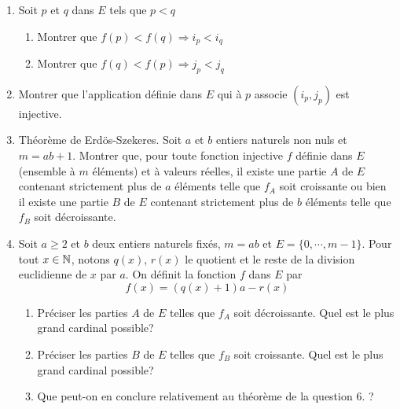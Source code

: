 \begin{enumerate}
\begin{enumerate}
\begin{itemize}
  \item $p\in A$
  \item $f_A$ d{\'e}croissante
\end{itemize}
On d{\'e}signe par $j_p$ le plus grand {\'e}l{\'e}ment de l'ensemble des cardinaux des parties v{\'e}rifiant ces conditions.
        \item Calculer les $j_p$ pour l'exemple de la question 1.
        \item Pr{\'e}senter les r{\'e}sultats des questions 2.b et 3.b. sous la forme d'un tableau dont la derni{\`e}re ligne est form{\'e}e par les couples $(i_p,j_p)$
      \end{enumerate}
\item Soit $p$ et $q$ dans $E$ tels que $p<q$
\begin{enumerate}
        \item Montrer que $f(p)<f(q)\Rightarrow i_p<i_q$
        \item Montrer que $f(q)<f(p)\Rightarrow j_p<j_q$
      \end{enumerate}
\item Montrer que l'application d{\'e}finie dans $E$ qui {\`a} $p$ associe $(i_p,j_p)$ est injective.
\item Th{\'e}or{\`e}me de Erd{\"o}s-Szekeres. \newline
Soit $a$ et $b$ entiers naturels non nuls et $m=ab+1$. Montrer que, pour toute fonction injective $f$ d{\'e}finie dans $E$ (ensemble à $m$ éléments) et {\`a} valeurs r{\'e}elles, il existe une partie $A$ de $E$ contenant strictement plus de $a$ {\'e}l{\'e}ments telle que $f_A$ soit croissante ou bien il existe une partie $B$ de $E$ contenant strictement plus de $b$ {\'e}l{\'e}ments telle que $f_B$ soit d{\'e}croissante.

\item Soit $a\geq 2$ et $b$ deux entiers naturels fix{\'e}s, $m=ab$ et $E=\{0,\cdots,m-1\}$. Pour tout $x\in\mathbb{N}$, notons $q(x)$, $r(x)$ le quotient et le reste de la division euclidienne de $x$ par $a$. On d{\'e}finit la fonction $f$ dans $E$ par
\[f(x)=(q(x)+1)a-r(x)\]
    \begin{enumerate}
        \item Pr{\'e}ciser les parties $A$ de $E$ telles que $f_A$ soit d{\'e}croissante. Quel est le plus grand cardinal possible?
        \item Pr{\'e}ciser les parties $B$ de $E$ telles que $f_B$ soit croissante. Quel est le plus grand cardinal
        possible?
        \item Que peut-on en conclure relativement au th{\'e}or{\`e}me de la question 6. ?
    \end{enumerate}

\end{enumerate}
